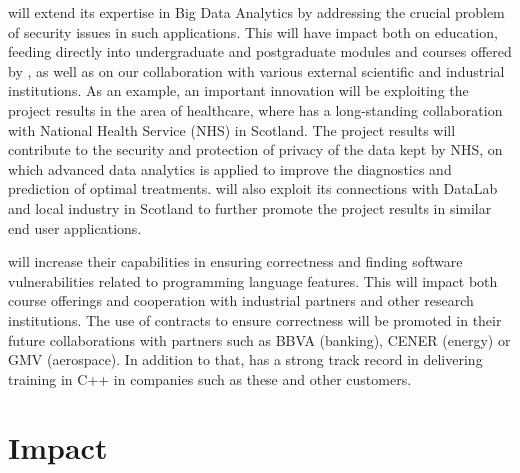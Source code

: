 \documentclass[a4paper,11pt]{article}
\begin{document}
\begin{mdframed}[backgroundcolor=blue!5]
\UODshort{} will extend its expertise in Big Data Analytics by addressing the crucial problem of security issues in such applications. This will have impact both on education, feeding directly into undergraduate and postgraduate modules and courses offered by \UODshort{}, as well as on our collaboration with various external scientific and industrial institutions. As an example, an important innovation will be exploiting the project results in the area of healthcare, where \UODshort{} has a long-standing collaboration with National Health Service (NHS) in Scotland. The project results will contribute to the security and protection of privacy of the data kept by NHS, on which advanced data analytics is applied to improve the diagnostics and prediction of optimal treatments. \UODshort{} will also exploit its connections with DataLab and local industry in Scotland
to further promote the project results in similar end user applications. 
\end{mdframed}

\begin{mdframed}[backgroundcolor=blue!5]
\UCMshort will increase their capabilities in ensuring correctness
and finding software vulnerabilities related to programming language
features. This will impact both course offerings and cooperation
with industrial partners and other research institutions. The use
of contracts to ensure correctness will be promoted in their future
collaborations with partners such as BBVA (banking), CENER (energy) or
GMV (aerospace). In addition to that, \UCMshort has a strong track record
in delivering training in C++ in companies such as these and other customers. 
\end{mdframed}





\clearpage
\section{Impact}
\label{sec:impact}

\end{document}
